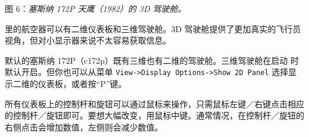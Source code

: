 \smallskip
 \noindent
\ifchinese
图 6：\textit{塞斯纳 172P 天鹰（1982）的 3D 驾驶舱。}
\fi

{}

\medskip
\ifchinese
\FlightGear{} 里的航空器可以有二维仪表板和三维驾驶舱。3D 驾驶舱提供了更加真实的飞行员视角，但对小显示器来说不太容易获取信息。

默认的塞斯纳 172P（c172p）既有三维也有二维的驾驶舱。三维驾驶舱在启动 \FlightGear{} 时默认开启。但你也可以从菜单 \texttt{View->Display Options->Show 2D Panel} 选择显示二维的仪表板，或者按“P”键。

所有仪表板上的控制杆和旋钮可以通过鼠标来操作，只需鼠标左键／右键点击相应的控制杆／旋钮即可。要想大幅改变，用鼠标中键。通常情况，在控制杆／旋钮的右侧点击会增加数值，左侧则会减少数值。


